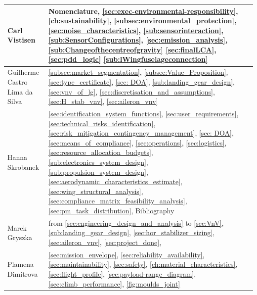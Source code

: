 \begin{table}[H]
\begin{tabularx}{\textwidth}{|>{\raggedright\arraybackslash}p{}|>{\raggedright\arraybackslash}X|}
        
         \\\hline 

        Carl Vistisen &
        Nomenclature,
        \autoref{sec:exec-environmental-responsibility},\autoref{ch:sustainability}, \autoref{subsec:environmental_protection}, \autoref{sec:noise_characteristics}, \autoref{sub:sensorinteraction},
        \autoref{sub:SensorConfigurations},
        \autoref{sec:emission_analysis}, \autoref{sub:Changeofthecentreofgravity}
        \autoref{sec:finalLCA},
        \autoref{sec:pdd_logic}
        \autoref{sub:lWingfuselageconnection}

        \\\hline 

        Guilherme Castro Lima da Silva &
       \autoref{subsec:market_segmentation}, \autoref{subsec:Value_Proposition}, \autoref{sec:type_certificate}, \autoref{sec: DOA}, \autoref{sub:landing_gear_design}, \autoref{sec:vnv_of_lg}, \autoref{sec:discretisation_and_assumptions}, \autoref{sec:H_stab_vnv}, \autoref{sec:aileron_vnv}
        
        
        \\\hline 


        Hanna Skrobanek & \autoref{sec:identification_system_functions}, \autoref{sec:user_requirements}, \autoref{sec:technical_risks_identification}, \autoref{sec:risk_mitigation_contingency_management}, \autoref{sec: DOA}, \autoref{sec:means_of_compliance}, \autoref{sec:operations}, \autoref{sec:logistics}, \autoref{sec:resource_allocation_budgets}, \autoref{sub:electronics_system_design}, \autoref{sub:propulsion_system_design}, \autoref{sec:aerodynamic_characteristics_estimate}, \autoref{sec:wing_structural_analysis}, \autoref{sec:compliance_matrix_feasibility_analysis}, \autoref{sec:pm_task_distribution}, Bibliography

        
        \\\hline 

        Marek Gryszka &
        from \autoref{sec:engineering_design_and_analysis} to \autoref{sec:VnV}, \autoref{sub:landing_gear_design}, \autoref{sec:hor_stabilizer_sizing},
        \autoref{sec:aileron_vnv},
        \autoref{sec:project_done},
        
        \\\hline 

        Plamena Dimitrova & \autoref{sec:mission_envelope}, \autoref{sec:reliability_availability}, \autoref{sec:maintainability}, \autoref{sec:safety}, \autoref{ch:material_characteristics}, \autoref{sec:flight_profile}, \autoref{sec:payload-range_diagram}, \autoref{sec:climb_performance}, \autoref{fig:moulds_joint}


\end{tabularx}
\end{table}
